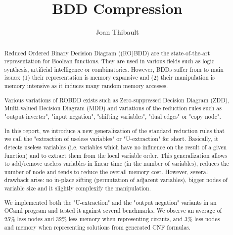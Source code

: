\documentclass[a4paper,10pt]{article}
\title{BDD Compression}
\author{Joan Thibault}
\begin{document}
\maketitle
\begin{abstract}
Reduced Ordered Binary Decision Diagram ((RO)BDD)\cite{Bryant1986, Somenzi1999} are the state-of-the-art representation for Boolean functions.
They are used in various fields such as logic synthesis, artificial intelligence or combinatorics.
However, BDDs suffer from to main issues: (1) their representation is memory expansive and (2) their manipulation is memory intensive as it induces many random memory accesses.


Various variations of ROBDD exists such as Zero-suppressed Decision Diagram (ZDD)\cite{IntroZDD}, Multi-valued Decision Diagram (MDD)\cite{IntroMDD, IntroMddRolf} and variations of the reduction rules such as "output inverter"\cite{BryantVariantN}, "input negation"\cite{MinatoVariants}, "shifting variables"\cite{MinatoVariants}, "dual edges"\cite{RolfVariantDual} or "copy node"\cite{RolfVariantCopy}.


In this report, we introduce a new generalization of the standard reduction rules that we call the "extraction of useless variables" or "U-extraction" for short.
Basically, it detects useless variables (i.e. variables which have no influence on the result of a given function) and to extract them from the local variable order.
This generalization allows to add/remove useless variables in linear time (in the number of variables), reduces the number of node and tends to reduce the overall memory cost.
However, several drawback arise: no in-place sifting (permutation of adjacent variables), bigger nodes of variable size and it slightly complexify the manipulation.


We implemented both the "U-extraction" and the "output negation" variants in an OCaml program and tested it against several benchmarks\cite{BenchSatlib, BenchLgsynth91, BenchIscas99}.
We observe an average of 25\% less nodes and 32\% less memory when representing circuits, and 3\% less nodes and memory when representing solutions from generated CNF formulas.
\end{abstract}


\newpage
\tableofcontents
\newpage
\newcommand{\shannon}[3]{#1 \longrightarrow_S #2, #3}
\newcommand{\B}{\mathbb{B}}%
\end{document}
